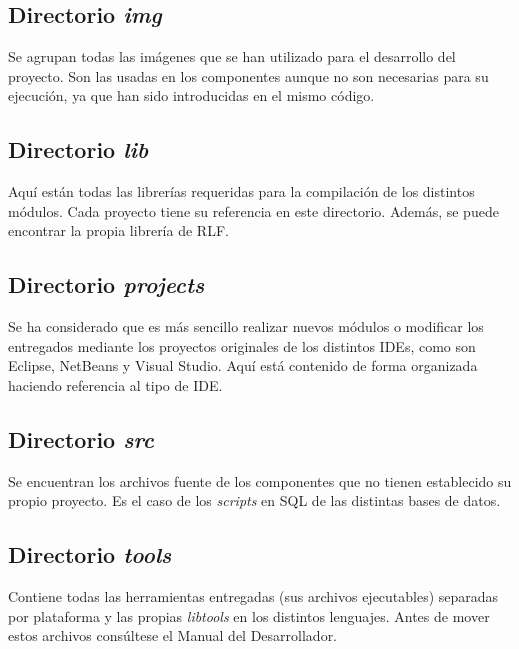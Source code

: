 \subsection*{Directorio \emph{img}}
Se agrupan todas las imágenes que se han utilizado para el desarrollo 
del proyecto. Son las usadas en los componentes aunque no son 
necesarias para su ejecución, ya que han sido introducidas en el mismo 
código.

\subsection*{Directorio \emph{lib}}
Aquí están todas las librerías requeridas para la compilación de 
los distintos módulos. Cada proyecto tiene su referencia en este 
directorio. Además, se puede encontrar la propia librería de RLF.

\subsection*{Directorio \emph{projects}}
Se ha considerado que es más sencillo realizar nuevos módulos o 
modificar los entregados mediante los proyectos originales de los 
distintos IDEs, como son Eclipse, NetBeans y Visual Studio. Aquí está 
contenido de forma organizada haciendo referencia al tipo de IDE.

\subsection*{Directorio \emph{src}}
Se encuentran los archivos fuente de los componentes que no tienen 
establecido su propio proyecto. Es el caso de los \emph{scripts} en 
SQL de las distintas bases de datos.

\subsection*{Directorio \emph{tools}}
Contiene todas las herramientas entregadas (sus archivos ejecutables) 
separadas por plataforma y las propias \emph{libtools} en los 
distintos lenguajes. Antes de mover estos archivos consúltese el 
Manual del Desarrollador.

\cleardoublepage
